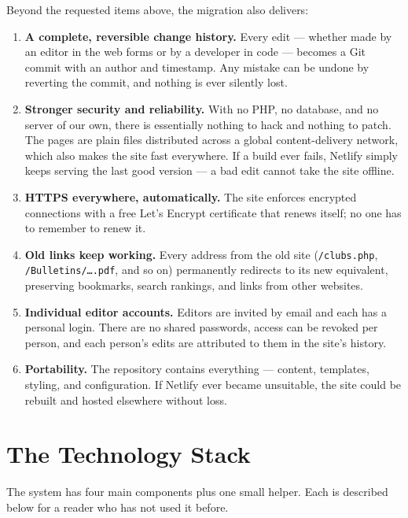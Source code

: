 \documentclass[12pt,letterpaper]{article}
\begin{document}
Beyond the requested items above, the migration also delivers:

\begin{enumerate}[resume]
  \item \textbf{A complete, reversible change history.} Every edit ---
  whether made by an editor in the web forms or by a developer in code ---
  becomes a Git commit with an author and timestamp. Any mistake can be
  undone by reverting the commit, and nothing is ever silently lost.

  \item \textbf{Stronger security and reliability.} With no PHP, no
  database, and no server of our own, there is essentially nothing to hack
  and nothing to patch. The pages are plain files distributed across a
  global content-delivery network, which also makes the site fast
  everywhere. If a build ever fails, Netlify simply keeps serving the last
  good version --- a bad edit cannot take the site offline.

  \item \textbf{HTTPS everywhere, automatically.} The site enforces
  encrypted connections with a free Let's Encrypt certificate that renews
  itself; no one has to remember to renew it.

  \item \textbf{Old links keep working.} Every address from the old site
  (\texttt{/clubs.php}, \texttt{/Bulletins/\ldots.pdf}, and so on)
  permanently redirects to its new equivalent, preserving bookmarks, search
  rankings, and links from other websites.

  \item \textbf{Individual editor accounts.} Editors are invited by email
  and each has a personal login. There are no shared passwords, access can
  be revoked per person, and each person's edits are attributed to them in
  the site's history.

  \item \textbf{Portability.} The repository contains everything --- content,
  templates, styling, and configuration. If Netlify ever became unsuitable,
  the site could be rebuilt and hosted elsewhere without loss.
\end{enumerate}

\section{The Technology Stack}
\label{sec:stack}

The system has four main components plus one small helper. Each is described
below for a reader who has not used it before.
\end{document}
